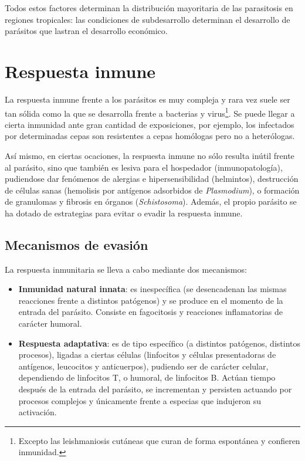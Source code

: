 Todos estos factores determinan la distribución mayoritaria de las parasitosis en regiones tropicales: las condiciones de subdesarrollo determinan el desarrollo de parásitos que lastran el desarrollo económico.
\section{Respuesta inmune}
La respuesta inmune frente a los parásitos es muy compleja y rara vez suele ser tan sólida como la que se desarrolla frente a bacterias y virus\footnote{Excepto las leishmaniosis cutáneas que curan de forma espontánea y confieren inmunidad.}. Se puede llegar a cierta inmunidad ante gran cantidad de exposiciones, por ejemplo, los infectados por determinadas cepas son resistentes a cepas homólogas pero no a heterólogas.

Así mismo, en ciertas ocaciones, la respuesta inmune no sólo resulta inútil frente al parásito, sino que también es lesiva para el hospedador (inmunopatología), pudiendose dar fenómenos de alergias e hipersensibilidad (helmintos), destrucción de células sanas (hemolisis por antígenos adsorbidos de \textit{Plasmodium}), o formación de granulomas y fibrosis en órganos (\textit{Schistosoma}). Además, el propio parásito se ha dotado de estrategias para evitar o evadir la respuesta inmune.
\subsection{Mecanismos de evasión}
La respuesta inmunitaria se lleva a cabo mediante dos mecanismos:
\begin{itemize}[itemsep=0pt,parsep=0pt,topsep=0pt,partopsep=0pt]
	\item \textbf{Inmunidad natural innata}: es inespecífica (se desencadenan las mismas reacciones frente a distintos patógenos) y se produce en el momento de la entrada del parásito. Consiste en fagocitosis y reacciones inflamatorias de carácter humoral.
	\item\textbf{Respuesta adaptativa}: es de tipo específico (a distintos patógenos, distintos procesos), ligadas a ciertas células (linfocitos y células presentadoras de antígenos, leucocitos y anticuerpos), pudiendo ser de carácter celular, dependiendo de linfocitos T, o humoral, de linfocitos B. Actúan tiempo después de la entrada del parásito, se incrementan y persisten actuando por procesos complejos y únicamente frente a especias que indujeron su activación.
\end{itemize}


